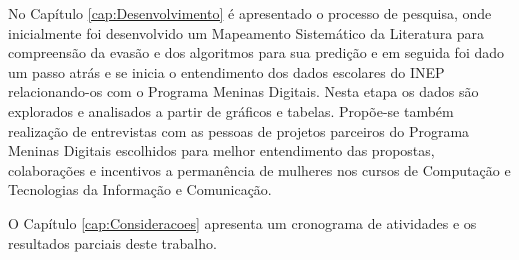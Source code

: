 No Capítulo \ref{cap:Desenvolvimento} é apresentado o processo de pesquisa, onde inicialmente foi desenvolvido um Mapeamento Sistemático da Literatura para compreensão da evasão e dos algoritmos para sua predição e em seguida foi dado um passo atrás e se inicia o entendimento dos dados escolares do INEP relacionando-os com o Programa Meninas Digitais. Nesta etapa os dados são explorados e analisados a partir de gráficos e tabelas. Propõe-se também realização de entrevistas com as pessoas de projetos parceiros do Programa Meninas Digitais escolhidos para melhor entendimento das propostas, colaborações e incentivos a permanência de mulheres nos cursos de Computação e Tecnologias da Informação e Comunicação.

O Capítulo \ref{cap:Consideracoes} apresenta um cronograma de atividades e os resultados parciais deste trabalho.


